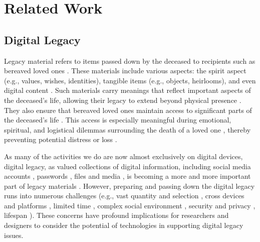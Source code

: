 \section{Related Work}


\subsection{Digital Legacy}

Legacy material refers to items passed down by the deceased to recipients such as bereaved loved ones \cite{doyle2023digital}. These materials include various aspects: the spirit aspect (e.g., values, wishes, identities), tangible items (e.g., objects, heirlooms), and even digital content \cite{doyle2023digital}. Such materials carry meanings that reflect important aspects of the deceased's life, allowing their legacy to extend beyond physical presence \cite{hunter2008beyond, gach2021getting}. They also ensure that bereaved loved ones maintain access to significant parts of the deceased's life \cite{jung2023bereaved, kim2024maintaining, brubaker2024ai}. This access is especially meaningful during emotional, spiritual, and logistical dilemmas surrounding the death of a loved one \cite{doyle2023digital}, thereby preventing potential distress or loss \cite{chen2021happens}. 

As many of the activities we do are now almost exclusively on digital devices, digital legacy, as valued collections of digital information, including social media accounts \cite{ohman2019dead, gach2021getting}, passwords \cite{holt2021personal, ferreira2011password}, files and media \cite{pfister2017will}, is becoming a more and more important part of legacy materials \cite{doyle2023digital, chen2021happens}.
However, preparing and passing down the digital legacy runs into numerous challenges (e.g., vast quantity and selection \cite{bergman2016science, vitale2018hoarding, jones2016curating}, cross devices and platforms \cite{odom2012lost, vertesi2016data}, limited time \cite{hunter2005leaving}, complex social environment \cite{doyle2023digital}, security and privacy \cite{edwards2013protecting, harbinja2019emails, holt2021personal}, lifespan \cite{gulotta2013digital}). These concerns have profound implications for researchers and designers to consider the potential of technologies in supporting digital legacy issues.

